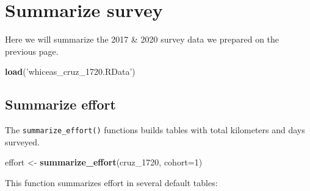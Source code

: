 \documentclass[
]{book}
\newenvironment{Shaded}{\begin{snugshade}}{\end{snugshade}}
\newcommand{\DataTypeTok}[1]{\textcolor[rgb]{0.13,0.29,0.53}{#1}}
\newcommand{\DecValTok}[1]{\textcolor[rgb]{0.00,0.00,0.81}{#1}}
\newcommand{\FloatTok}[1]{\textcolor[rgb]{0.00,0.00,0.81}{#1}}
\newcommand{\KeywordTok}[1]{\textcolor[rgb]{0.13,0.29,0.53}{\textbf{#1}}}
\newcommand{\NormalTok}[1]{#1}
\newcommand{\OperatorTok}[1]{\textcolor[rgb]{0.81,0.36,0.00}{\textbf{#1}}}
\newcommand{\StringTok}[1]{\textcolor[rgb]{0.31,0.60,0.02}{#1}}
\begin{document}
\begin{Shaded}
\end{Shaded}

\hypertarget{summarize}{%
\chapter{Summarize survey}\label{summarize}}

Here we will summarize the 2017 \& 2020 survey data we prepared on the previous page.

\begin{Shaded}
\begin{Highlighting}[]
\KeywordTok{load}\NormalTok{(}\StringTok{'whiceas_cruz_1720.RData'}\NormalTok{)}
\end{Highlighting}
\end{Shaded}

\hypertarget{summarize-effort}{%
\section*{Summarize effort}\label{summarize-effort}}

The \texttt{summarize\_effort()} functions builds tables with total kilometers and days surveyed.

\begin{Shaded}
\begin{Highlighting}[]
\NormalTok{effort <-}\StringTok{ }\KeywordTok{summarize_effort}\NormalTok{(cruz_}\DecValTok{1720}\NormalTok{,}
                           \DataTypeTok{cohort=}\DecValTok{1}\NormalTok{)}
\end{Highlighting}
\end{Shaded}

This function summarizes effort in several default tables:

\begin{Shaded}
\end{Shaded}
\end{document}
